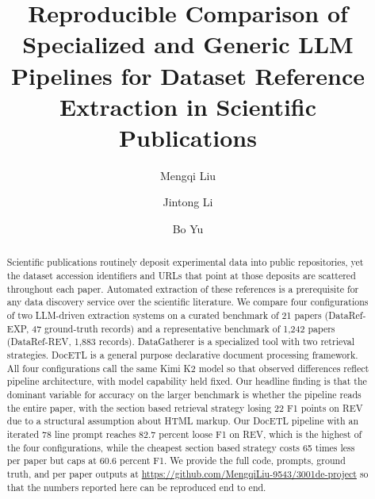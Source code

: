 \documentclass[sigconf,nonacm]{acmart}
\begin{document}
\title{Reproducible Comparison of Specialized and Generic LLM Pipelines for Dataset Reference Extraction in Scientific Publications}

\author{Mengqi Liu}

\author{Jintong Li}

\author{Bo Yu}

\renewcommand{\shortauthors}{Liu, Li, and Yu}

\begin{abstract}
Scientific publications routinely deposit experimental data into public repositories, yet the dataset accession identifiers and URLs that point at those deposits are scattered throughout each paper. Automated extraction of these references is a prerequisite for any data discovery service over the scientific literature. We compare four configurations of two LLM-driven extraction systems on a curated benchmark of 21 papers (DataRef-EXP, 47 ground-truth records) and a representative benchmark of 1{,}242 papers (DataRef-REV, 1{,}883 records). DataGatherer is a specialized tool with two retrieval strategies. DocETL is a general purpose declarative document processing framework. All four configurations call the same Kimi K2 model so that observed differences reflect pipeline architecture, with model capability held fixed. Our headline finding is that the dominant variable for accuracy on the larger benchmark is whether the pipeline reads the entire paper, with the section based retrieval strategy losing 22 F1 points on REV due to a structural assumption about HTML markup. Our DocETL pipeline with an iterated 78 line prompt reaches 82.7 percent loose F1 on REV, which is the highest of the four configurations, while the cheapest section based strategy costs 65 times less per paper but caps at 60.6 percent F1. We provide the full code, prompts, ground truth, and per paper outputs at \url{https://github.com/MengqiLiu-9543/3001de-project} so that the numbers reported here can be reproduced end to end.
\end{abstract}

\end{document}
